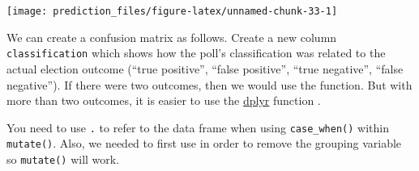 \documentclass[]{book}
\newenvironment{Shaded}{\begin{snugshade}}{\end{snugshade}}
\newcommand{\DataTypeTok}[1]{\textcolor[rgb]{0.13,0.29,0.53}{#1}}
\newcommand{\DecValTok}[1]{\textcolor[rgb]{0.00,0.00,0.81}{#1}}
\newcommand{\KeywordTok}[1]{\textcolor[rgb]{0.13,0.29,0.53}{\textbf{#1}}}
\newcommand{\NormalTok}[1]{#1}
\newcommand{\OperatorTok}[1]{\textcolor[rgb]{0.81,0.36,0.00}{\textbf{#1}}}
\newcommand{\StringTok}[1]{\textcolor[rgb]{0.31,0.60,0.02}{#1}}
\theoremstyle{definition}
\theoremstyle{definition}
\theoremstyle{definition}
\theoremstyle{remark}
\begin{document}
\begin{center}\texttt{[image: prediction\_files/figure-latex/unnamed-chunk-33-1]} \end{center}

We can create a confusion matrix as follows. Create a new column
\texttt{classification} which shows how the poll's classification was
related to the actual election outcome (``true positive'', ``false
positive'', ``true negative'', ``false negative''). If there were two
outcomes, then we would use the function. But with more than two
outcomes, it is easier to use the
\href{https://cran.r-project.org/package=dplyr}{dplyr} function .

\begin{Shaded}
\end{Shaded}

You need to use \texttt{.} to refer to the data frame when using
\texttt{case\_when()} within \texttt{mutate()}. Also, we needed to first
use in order to remove the grouping variable so \texttt{mutate()} will
work.
\end{document}
